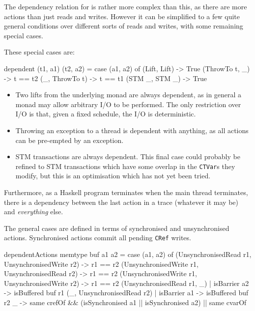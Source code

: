 The dependency relation for \dejafu{} is rather more complex than
this, as there are more actions than just reads and writes. However it
can be simplified to a few quite general conditions over different
sorts of reads and writes, with some remaining special cases.

These special cases are:

\begin{haskellcode}
dependent (t1, a1) (t2, a2) = case (a1, a2) of
  (Lift, Lift)   -> True
  (ThrowTo t, _) -> t == t2
  (_, ThrowTo t) -> t == t1
  (STM _, STM _) -> True
\end{haskellcode}

\begin{itemize}
\item Two lifts from the underlying monad are always dependent, as in
  general a monad may allow arbitrary I/O to be performed. The only
  restriction over I/O is that, given a fixed schedule, the I/O is
  deterministic.

\item Throwing an exception to a thread is dependent with anything, as
  all actions can be pre-empted by an exception.

\item STM transactions are always dependent. This final case could
  probably be refined to STM transactions which have some overlap in
  the \verb|CTVar|s they modify, but this is an optimisation which has
  not yet been tried.
\end{itemize}

Furthermore, as a Haskell program terminates when the main thread
terminates, there is a dependency between the last action in a trace
(whatever it may be) and \emph{everything} else.

The general cases are defined in terms of synchronised and
unsynchronised actions. Synchronised actions commit all pending
\verb|CRef| writes.

\begin{haskellcode}
dependentActions memtype buf a1 a2 = case (a1, a2) of
  (UnsynchronisedRead  r1, UnsynchronisedWrite r2) -> r1 == r2
  (UnsynchronisedWrite r1, UnsynchronisedRead  r2) -> r1 == r2
  (UnsynchronisedWrite r1, UnsynchronisedWrite r2) -> r1 == r2
  (UnsynchronisedRead r1, _) | isBarrier a2 -> isBuffered buf r1
  (_, UnsynchronisedRead r2) | isBarrier a1 -> isBuffered buf r2
  _ -> same crefOf && (isSynchronised a1 || isSynchronised a2) || same cvarOf
\end{haskellcode}

